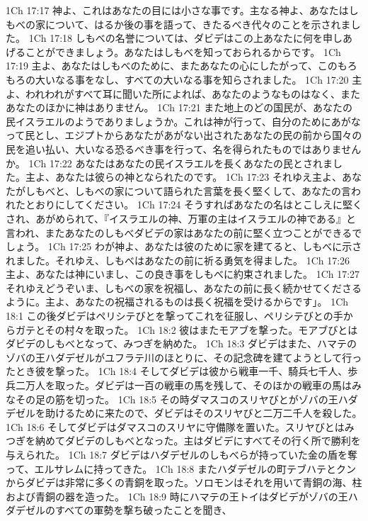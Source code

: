 1Ch 17:17  神よ、これはあなたの目には小さな事です。主なる神よ、あなたはしもべの家について、はるか後の事を語って、きたるべき代々のことを示されました。
1Ch 17:18  しもべの名誉については、ダビデはこの上あなたに何を申しあげることができましょう。あなたはしもべを知っておられるからです。
1Ch 17:19  主よ、あなたはしもべのために、またあなたの心にしたがって、このもろもろの大いなる事をなし、すべての大いなる事を知らされました。
1Ch 17:20  主よ、われわれがすべて耳に聞いた所によれば、あなたのようなものはなく、またあなたのほかに神はありません。
1Ch 17:21  また地上のどの国民が、あなたの民イスラエルのようでありましょうか。これは神が行って、自分のためにあがなって民とし、エジプトからあなたがあがない出されたあなたの民の前から国々の民を追い払い、大いなる恐るべき事を行って、名を得られたものではありませんか。
1Ch 17:22  あなたはあなたの民イスラエルを長くあなたの民とされました。主よ、あなたは彼らの神となられたのです。
1Ch 17:23  それゆえ主よ、あなたがしもべと、しもべの家について語られた言葉を長く堅くして、あなたの言われたとおりにしてください。
1Ch 17:24  そうすればあなたの名はとこしえに堅くされ、あがめられて、『イスラエルの神、万軍の主はイスラエルの神である』と言われ、またあなたのしもべダビデの家はあなたの前に堅く立つことができるでしょう。
1Ch 17:25  わが神よ、あなたは彼のために家を建てると、しもべに示されました。それゆえ、しもべはあなたの前に祈る勇気を得ました。
1Ch 17:26  主よ、あなたは神にいまし、この良き事をしもべに約束されました。
1Ch 17:27  それゆえどうぞいま、しもべの家を祝福し、あなたの前に長く続かせてくださるように。主よ、あなたの祝福されるものは長く祝福を受けるからです」。
1Ch 18:1  この後ダビデはペリシテびとを撃ってこれを征服し、ペリシテびとの手からガテとその村々を取った。
1Ch 18:2  彼はまたモアブを撃った。モアブびとはダビデのしもべとなって、みつぎを納めた。
1Ch 18:3  ダビデはまた、ハマテのゾバの王ハダデゼルがユフラテ川のほとりに、その記念碑を建てようとして行ったとき彼を撃った。
1Ch 18:4  そしてダビデは彼から戦車一千、騎兵七千人、歩兵二万人を取った。ダビデは一百の戦車の馬を残して、そのほかの戦車の馬はみなその足の筋を切った。
1Ch 18:5  その時ダマスコのスリヤびとがゾバの王ハダデゼルを助けるために来たので、ダビデはそのスリヤびと二万二千人を殺した。
1Ch 18:6  そしてダビデはダマスコのスリヤに守備隊を置いた。スリヤびとはみつぎを納めてダビデのしもべとなった。主はダビデにすべてその行く所で勝利を与えられた。
1Ch 18:7  ダビデはハダデゼルのしもべらが持っていた金の盾を奪って、エルサレムに持ってきた。
1Ch 18:8  またハダデゼルの町テブハテとクンからダビデは非常に多くの青銅を取った。ソロモンはそれを用いて青銅の海、柱および青銅の器を造った。
1Ch 18:9  時にハマテの王トイはダビデがゾバの王ハダデゼルのすべての軍勢を撃ち破ったことを聞き、

